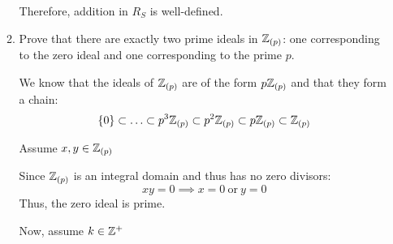 \documentclass[letterpaper,12pt,fleqn]{article}
\begin{document}
\begin{enumerate}
\begin{enumerate}
    Therefore, addition in $R_S$ is well-defined.

    \newcommand{\Zp}{\Z_{(p)}}

  \item Prove that there are exactly two prime ideals in $\Zp$: one
    corresponding to the zero ideal and one corresponding to the prime $p$.

    We know that the ideals of $\Zp$ are of the form $p\Zp$ and that they form
    a chain:
    \[\{0\}\subset\ldots\subset p^3\Zp\subset p^2\Zp\subset p\Zp\subset\Zp\]

    Assume $x,y\in\Zp$

    Since $\Zp$ is an integral domain and thus has no zero divisors:
    \[xy=0\implies x=0\ \mbox{or}\ y=0\]
    Thus, the zero ideal is prime.

    Now, assume $k\in\mathbb{Z}^+$
  \end{enumerate}
\end{enumerate}
\end{document}
